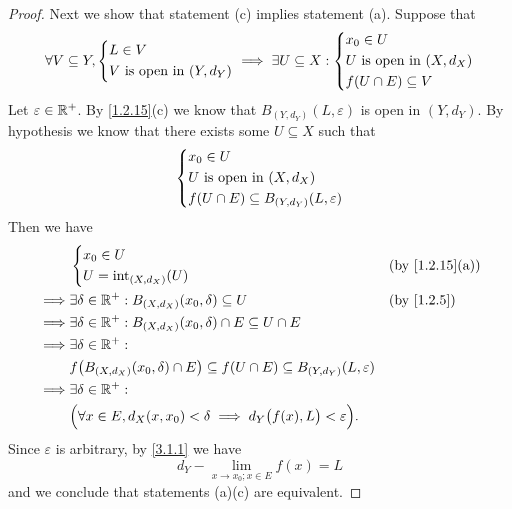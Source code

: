 \begin{proof}
  Next we show that statement (c) implies statement (a).
  Suppose that
  \[
    \forall V \subseteq Y, \begin{dcases}
      L \in V \\
      V \text{ is open in } (Y, d_Y)
    \end{dcases} \implies \exists U \subseteq X : \begin{dcases}
      x_0 \in U                      \\
      U \text{ is open in } (X, d_X) \\
      f(U \cap E) \subseteq V
    \end{dcases}
  \]
  Let \(\varepsilon \in \mathbb{R}^+\).
  By \cref{1.2.15}(c) we know that \(B_{(Y, d_Y)}(L, \varepsilon)\) is open in \((Y, d_Y)\).
  By hypothesis we know that there exists some \(U \subseteq X\) such that
  \[
    \begin{dcases}
      x_0 \in U                      \\
      U \text{ is open in } (X, d_X) \\
      f(U \cap E) \subseteq B_{(Y, d_Y)}(L, \varepsilon)
    \end{dcases}
  \]
  Then we have
  \begin{align*}
             & \begin{dcases}
                 x_0 \in U \\
                 U = \text{int}_{(X, d_X)}(U)
               \end{dcases}                                                                             &  & \text{(by \cref{1.2.15}(a))} \\
    \implies & \exists \delta \in \R^+ : B_{(X, d_X)}(x_0, \delta) \subseteq U                                          &  & \by{1.2.5}   \\
    \implies & \exists \delta \in \R^+ : B_{(X, d_X)}(x_0, \delta) \cap E \subseteq U \cap E                                              \\
    \implies & \exists \delta \in \R^+ :                                                                                                  \\
             & f\big(B_{(X, d_X)}(x_0, \delta) \cap E\big) \subseteq f(U \cap E) \subseteq B_{(Y, d_Y)}(L, \varepsilon)                   \\
    \implies & \exists \delta \in \R^+ :                                                                                                  \\
             & \Big(\forall x \in E, d_X(x, x_0) < \delta \implies d_Y\big(f(x), L\big) < \varepsilon\Big).
  \end{align*}
  Since \(\varepsilon\) is arbitrary, by \cref{3.1.1} we have
  \[
    d_Y - \lim_{x \to x_0 ; x \in E} f(x) = L
  \]
  and we conclude that statements (a)(c) are equivalent.


\end{proof}
